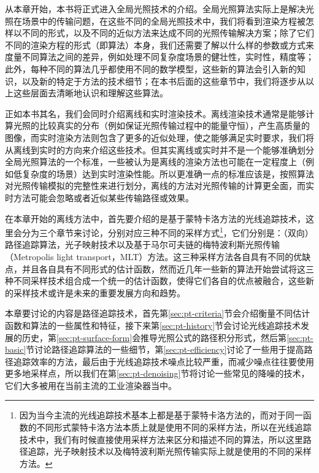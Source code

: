 从本章开始，本书将正式进入全局光照技术的介绍。全局光照算法实际上是解决光照在场景中的传输问题，在这些不同的全局光照技术中，我们将看到渲染方程被怎样以不同的形式，以及不同的近似方法来达成不同的光照传输解决方案；除了它们不同的渲染方程的形式（即算法）本身，我们还需要了解以什么样的参数或方式来度量不同算法之间的差异，例如处理不同复杂度场景的健壮性，实时性，精度等；此外，每种不同的算法几乎都使用不同的数学模型，这些新的算法会引入新的知识，以及新的特定于方法的技术细节；在本书后面的这些章节中，我们将逐步从以上这些层面去清晰地认识和理解这些算法。

正如本书其名，我们会同时介绍离线和实时渲染技术。离线渲染技术通常是能够计算光照的比较真实的分布（例如保证光照传输过程中的能量守恒），产生高质量的图像，而实时渲染方法则包含了更多的近似处理，使之能够满足实时要求，我们将从离线到实时的方向来介绍这些技术。但其实离线或实时并不是一个能够准确划分全局光照算法的一个标准，一些被认为是离线的渲染方法也可能在一定程度上（例如低复杂度的场景）达到实时渲染性能。所以更准确一点的标准应该是，按照算法对光照传输模拟的完整性来进行划分，离线的方法对光照传输的计算更全面，而实时方法可能会忽略或者近似某些传输路径或效果。

在本章开始的离线方法中，首先要介绍的是基于蒙特卡洛方法的光线追踪技术，这里会分为三个章节来讨论，分别对应三种不同的采样方式\footnote{因为当今主流的光线追踪技术基本上都是基于蒙特卡洛方法的，而对于同一函数的不同形式蒙特卡洛方法本质上就是使用不同的采样方法，所以在光线追踪技术中，我们有时候直接使用采样方法来区分和描述不同的算法，所以这里路径追踪，光子映射技术以及梅特波利斯光照传输实际上就是使用的不同的采样方法。}，它们分别是：（双向）路径追踪算法，光子映射技术以及基于马尔可夫链的梅特波利斯光照传输（Metropolis light transport，MLT）方法。这三种采样方法各自具有不同的优缺点，并且各自具有不同形式的估计函数，然而近几年一些新的算法开始尝试将这三种不同采样技术组合成一个统一的估计函数，使得它们各自的优点被融合，这些新的采样技术或许是未来的重要发展方向和趋势。

本章要讨论的内容是路径追踪技术，首先第\ref{sec:pt-criteria}节会介绍衡量不同估计函数和算法的一些属性和特征，接下来第\ref{sec:pt-history}节会讨论光线追踪技术发展的历史，第\ref{sec:pt-surface-form}会推导光照公式的路径积分形式，然后第\ref{sec:pt-basic}节讨论路径追踪算法的一些细节，第\ref{sec:pt-efficiency}讨论了一些用于提高路径追踪效率的方法，最后由于光线追踪技术噪点比较严重，而减少噪点往往要使用更多地采样点，所以我们在第\ref{sec:pt-denoising}节将讨论一些常见的降噪的技术，它们大多被用在当前主流的工业渲染器当中。






